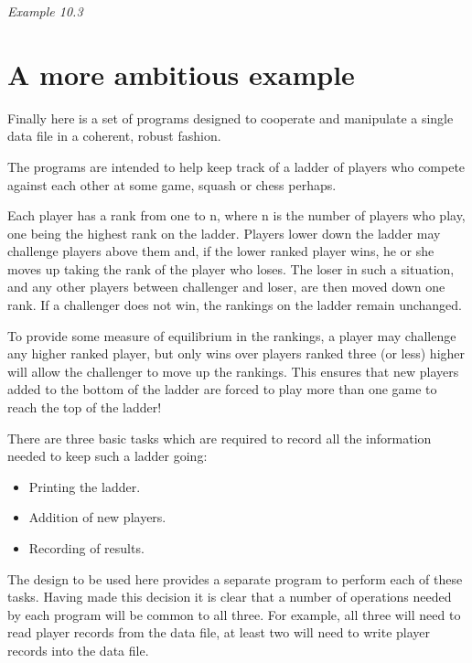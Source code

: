  \begin{center}\textit{Example 10.3}\end{center}


 
        \section{A more ambitious example}
        

  

  Finally here is a set of programs designed to cooperate and manipulate
   a single data file in a coherent, robust fashion.


  The programs are intended to help keep track of a ladder of players who
   compete against each other at some game, squash or chess perhaps.


  Each player has a rank from one to n, where n is the number of players who
   play, one being the highest rank on the ladder. Players lower down the
   ladder may challenge players above them and, if the lower ranked player
   wins, he or she moves up taking the rank of the player who loses. The loser
   in such a situation, and any other players between challenger and loser, are
   then moved down one rank. If a challenger does not win, the rankings on the
   ladder remain unchanged.


  To provide some measure of equilibrium in the rankings, a player may
   challenge any higher ranked player, but only wins over players ranked three
   (or less) higher will allow the challenger to move up the rankings. This
   ensures that new players added to the bottom of the ladder are forced to
   play more than one game to reach the top of the ladder!


  There are three basic tasks which are required to record all the
   information needed to keep such a ladder going:


  \begin{itemize}
   \item Printing the ladder.
   \item Addition of new players.
   \item Recording of results.
  \end{itemize}

  The design to be used here provides a separate program to perform each of
   these tasks. Having made this decision it is clear that a number of
   operations needed by each program will be common to all three. For example,
   all three will need to read player records from the data file, at least two
   will need to write player records into the data file.


